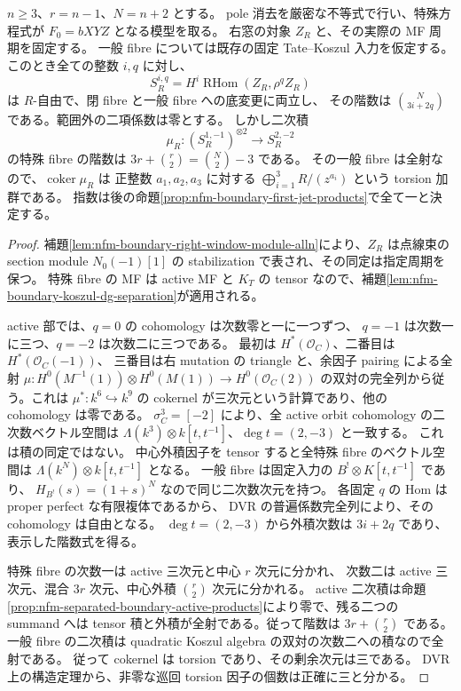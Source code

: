 \begin{proposition}
\label{prop:nfm-boundary-all-orbit-flat-rank-drop}
$n\ge3$、$r=n-1$、$N=n+2$ とする。
pole 消去を厳密な不等式で行い、特殊方程式が $F_0=bXYZ$ となる模型を取る。
右窓の対象 $Z_R$ と、その実際の MF 周期を固定する。
一般 fibre については既存の固定 Tate--Koszul 入力を仮定する。
このとき全ての整数 $i,q$ に対し、
\[
 S_R^{i,q}=H^i\operatorname{RHom}(Z_R,\rho^qZ_R)
\]
は $R$-自由で、閉 fibre と一般 fibre への底変更に両立し、
その階数は $\binom N{3i+2q}$ である。範囲外の二項係数は零とする。
しかし二次積
\[
 \mu_R:(S_R^{1,-1})^{\otimes2}\longrightarrow S_R^{2,-2}
\]
の特殊 fibre の階数は $3r+\binom r2=\binom N2-3$ である。
その一般 fibre は全射なので、$\operatorname{coker}\mu_R$ は
正整数 $a_1,a_2,a_3$ に対する
$\bigoplus_{i=1}^3R/(z^{a_i})$ という torsion 加群である。
指数は後の命題\ref{prop:nfm-boundary-first-jet-products}で全て一と決定する。
\end{proposition}

\begin{proof}
補題\ref{lem:nfm-boundary-right-window-module-alln}により、$Z_R$ は点線束の section module $N_0(-1)[1]$ の
stabilization で表され、その同定は指定周期を保つ。
特殊 fibre の MF は active MF と $K_T$ の tensor なので、補題\ref{lem:nfm-boundary-koszul-dg-separation}が適用される。

active 部では、$q=0$ の cohomology は次数零と一に一つずつ、
$q=-1$ は次数一に三つ、$q=-2$ は次数二に三つである。
最初は $H^*(\mathcal O_C)$、二番目は $H^*(\mathcal O_C(-1))$、
三番目は右 mutation の triangle と、余因子 pairing による全射
$\mu:H^0(M^{-1}(1))\otimes H^0(M(1))\to H^0(\mathcal O_C(2))$
の双対の完全列から従う。これは $\mu^*:k^6\hookrightarrow k^9$ の cokernel が三次元という計算であり、他の cohomology は零である。
$\sigma_C^3=[-2]$ により、全 active orbit cohomology の二次数ベクトル空間は
$\Lambda(k^3)\otimes k[t,t^{-1}]$、$\deg t=(2,-3)$ と一致する。
これは積の同定ではない。
中心外積因子を tensor すると全特殊 fibre のベクトル空間は
$\Lambda(k^N)\otimes k[t,t^{-1}]$ となる。
一般 fibre は固定入力の $B^!\otimes K[t,t^{-1}]$ であり、
$H_{B^!}(s)=(1+s)^N$ なので同じ二次数次元を持つ。
各固定 $q$ の Hom は proper perfect な有限複体であるから、
DVR の普遍係数完全列により、その cohomology は自由となる。
$\deg t=(2,-3)$ から外積次数は $3i+2q$ であり、表示した階数式を得る。

特殊 fibre の次数一は active 三次元と中心 $r$ 次元に分かれ、
次数二は active 三次元、混合 $3r$ 次元、中心外積 $\binom r2$ 次元に分かれる。
active 二次積は命題\ref{prop:nfm-separated-boundary-active-products}により零で、残る二つの summand へは
tensor 積と外積が全射である。従って階数は $3r+\binom r2$ である。
一般 fibre の二次積は quadratic Koszul algebra の双対の次数二への積なので全射である。
従って cokernel は torsion であり、その剰余次元は三である。
DVR 上の構造定理から、非零な巡回 torsion 因子の個数は正確に三と分かる。
\end{proof}


